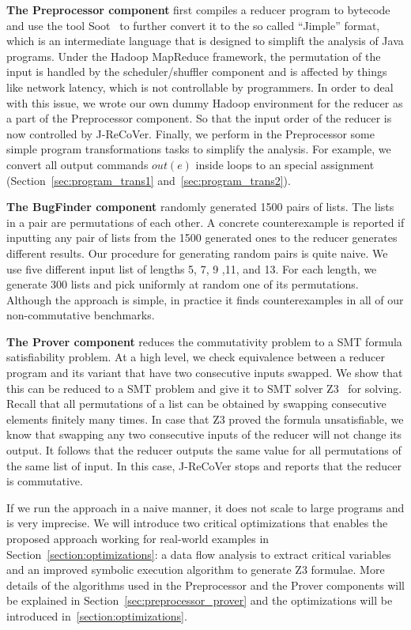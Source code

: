 \documentclass{llncs}
\begin{document}
\textbf{The Preprocessor component} first compiles a reducer program to bytecode and use the tool Soot~\cite{soot} to further convert it to the so called ``Jimple'' format, which is an intermediate language that is designed to simplift the analysis of Java programs. Under the Hadoop MapReduce framework, the permutation of the input is handled by the scheduler/shuffler component and is affected by things like network latency, which is not controllable by programmers. In order to deal with this issue, we wrote our own dummy Hadoop environment for the reducer as a part of the Preprocessor component. So that the input order of the reducer is now controlled by J-ReCoVer. Finally, we perform in the Preprocessor some simple program transformations tasks to simplify the analysis. For example, we convert all output commands $out(e)$ inside loops to an special assignment (Section~\ref{sec:program_trans1} and~\ref{sec:program_trans2}).

\textbf{The BugFinder component} randomly generated 1500 pairs of lists. The lists in a pair are permutations of each other. A concrete counterexample is reported if inputting any pair of lists from the 1500 generated ones to the reducer generates different results.
Our procedure for generating random pairs is quite naive. We use five different input list of lengths 5, 7, 9 ,11, and 13. For each length, we generate 300 lists and pick uniformly at random one of its permutations. Although the approach is simple, in practice it finds counterexamples in all of our non-commutative benchmarks.

\textbf{The Prover component} reduces the commutativity problem to a SMT formula satisfiability problem. At a high level, we check equivalence between a reducer program and its variant that have two consecutive inputs swapped. We show that this can be reduced to a SMT problem and give it to SMT solver Z3~\cite{z3} for solving. Recall that all permutations of a list can be obtained by swapping consecutive elements finitely many times. In case that Z3 proved the formula unsatisfiable, we know that swapping any two consecutive inputs of the reducer will not change its output. It follows that the reducer outputs the same value for all permutations of the same list of input.
In this case,  J-ReCoVer stops and reports that the reducer is commutative. 

If we run the approach in a naive manner, it does not scale to large programs and is very imprecise.  We will introduce two critical optimizations that enables the proposed approach working for real-world examples in Section~\ref{section:optimizations}: a data flow analysis to extract critical variables and an improved symbolic execution algorithm to generate Z3 formulae. More details of the algorithms used in the Preprocessor and the Prover components will be explained in Section~\ref{sec:preprocessor_prover} and the optimizations will be introduced in~\ref{section:optimizations}. 
\end{document}
